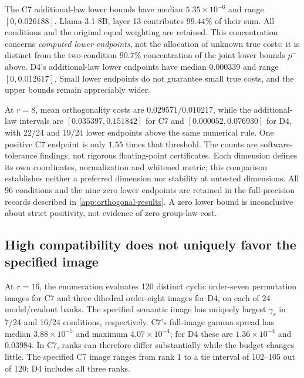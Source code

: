 The C7 additional-law lower bounds have median $5.35\times10^{-6}$ and range $[0,0.026188]$. Llama-3.1-8B, layer 13 contributes $99.44\%$ of their sum. All conditions and the original equal weighting are retained. This concentration concerns \emph{computed lower endpoints}, not the allocation of unknown true costs; it is distinct from the two-condition $90.7\%$ concentration of the joint lower bounds $p^-$ above. D4's additional-law lower endpoints have median $0.000339$ and range $[0,0.012617]$. Small lower endpoints do not guarantee small true costs, and the upper bounds remain appreciably wider.

At $r=8$, mean orthogonality costs are $0.029571/0.010217$, while the additional-law intervals are $[0.035397,0.151842]$ for C7 and $[0.000052,0.076930]$ for D4, with 22/24 and 19/24 lower endpoints above the same numerical rule. One positive C7 endpoint is only $1.55$ times that threshold. The counts are software-tolerance findings, not rigorous floating-point certificates. Each dimension defines its own coordinates, normalization and whitened metric; this comparison establishes neither a preferred dimension nor stability at untested dimensions. All 96 conditions and the nine zero lower endpoints are retained in the full-precision records described in \cref{app:orthogonal-results}. A zero lower bound is inconclusive about strict positivity, not evidence of zero group-law cost.

\subsection{High compatibility does not uniquely favor the specified image}
At $r=16$, the enumeration evaluates 120 distinct cyclic order-seven permutation images for C7 and three dihedral order-eight images for D4, on each of 24 model/readout banks. The specified semantic image has uniquely largest $\gamma_r$ in 7/24 and 16/24 conditions, respectively. C7's full-image gamma spread has median $3.88\times10^{-5}$ and maximum $4.07\times10^{-4}$; for D4 these are $1.36\times10^{-4}$ and $0.03984$. In C7, ranks can therefore differ substantially while the budget changes little. The specified C7 image ranges from rank 1 to a tie interval of 102--105 out of 120; D4 includes all three ranks.


